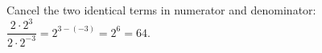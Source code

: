 Cancel the two identical terms in numerator and denominator: $\dfrac{2\cdot2^3}{2\cdot2^{-3}}=2^{3-(-3)}=2^6=\boxed{64}$.
